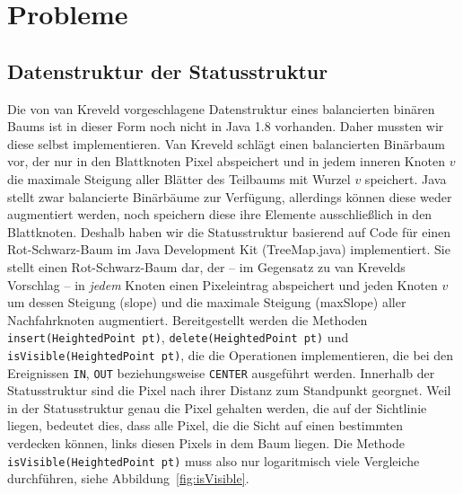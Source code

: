 \section{Probleme}

\subsection{Datenstruktur der Statusstruktur}
\label{tree}
Die von van Kreveld vorgeschlagene Datenstruktur eines balancierten binären Baums ist in dieser Form noch nicht in Java 1.8 vorhanden. Daher mussten 
wir diese selbst implementieren.
Van Kreveld schlägt einen balancierten Binärbaum vor, der nur in den Blattknoten Pixel abspeichert
und in jedem inneren Knoten $v$ die maximale Steigung aller Blätter des Teilbaums mit Wurzel $v$ speichert.
Java stellt zwar balancierte Binärbäume zur Verfügung, allerdings können diese weder augmentiert werden,
noch speichern diese ihre Elemente ausschließlich in den Blattknoten.
Deshalb haben wir die Statusstruktur basierend auf Code für einen Rot-Schwarz-Baum im Java Development Kit (TreeMap.java) implementiert.
Sie stellt einen Rot-Schwarz-Baum dar, der -- im Gegensatz zu van Krevelds Vorschlag -- in \emph{jedem} Knoten einen Pixeleintrag abspeichert
und jeden Knoten $v$ um dessen Steigung (slope) und die maximale Steigung (maxSlope) aller Nachfahrknoten augmentiert.
Bereitgestellt werden die Methoden \verb|insert(HeightedPoint pt)|, \verb|delete(HeightedPoint pt)| und \verb|isVisible(HeightedPoint pt)|,
die die Operationen implementieren, die bei den Ereignissen \verb|IN|, \verb|OUT| beziehungsweise \verb|CENTER| ausgeführt werden.
Innerhalb der Statusstruktur sind die Pixel nach ihrer Distanz zum Standpunkt georgnet.
Weil in der Statusstruktur genau die Pixel gehalten werden, die auf der Sichtlinie liegen, bedeutet dies,
dass alle Pixel, die die Sicht auf einen bestimmten verdecken können, links diesen Pixels in dem Baum liegen.
Die Methode \verb|isVisible(HeightedPoint pt)| muss also nur logaritmisch viele Vergleiche durchführen, siehe Abbildung~\ref{fig:isVisible}.

